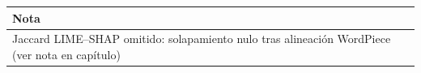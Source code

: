 \begin{tabular}{l}
\toprule
Nota \\
\midrule
Jaccard LIME--SHAP omitido: solapamiento nulo tras alineación WordPiece (ver nota en capítulo) \\
\bottomrule
\end{tabular}
